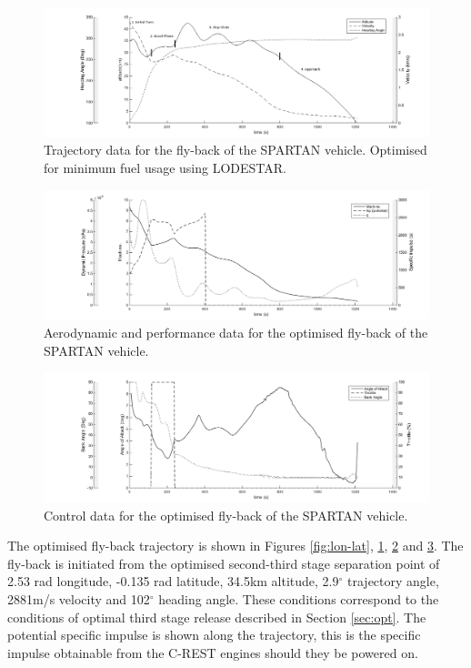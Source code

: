 \documentclass[conf]{new-aiaa}
\begin{document}
\begin{figure}[h]
	\centering
	\includegraphics[width=0.9\linewidth]{Figures/Traj1}
	\caption{Trajectory data for the fly-back of the SPARTAN vehicle. Optimised for minimum fuel usage using LODESTAR. }
	\label{fig:Traj1}
\end{figure}
\begin{figure}[h]
	\centering
	\includegraphics[width=0.9\linewidth]{Figures/Traj2}
	\caption{Aerodynamic and performance data for the optimised fly-back of the SPARTAN vehicle. }
	\label{fig:Traj2}
\end{figure}
\begin{figure}[h]
	\centering
	\includegraphics[width=0.9\linewidth]{Figures/Traj3}
	\caption{Control data for the optimised fly-back of the SPARTAN vehicle.}
	\label{fig:Traj3}
\end{figure}

The optimised fly-back trajectory is shown in Figures \ref{fig:lon-lat}, \ref{fig:Traj1}, \ref{fig:Traj2} and \ref{fig:Traj3}.
The fly-back is initiated from the optimised second-third stage separation point of 2.53 rad longitude, -0.135 rad latitude, 34.5km altitude, 2.9$^\circ$ trajectory angle, 2881m/s velocity and 102$^\circ$ heading angle. These conditions correspond to the conditions of optimal third stage release described in Section \ref*{sec:opt}. The potential specific impulse is shown along the trajectory, this is the specific impulse obtainable from the C-REST engines should they be powered on.
\end{document}
